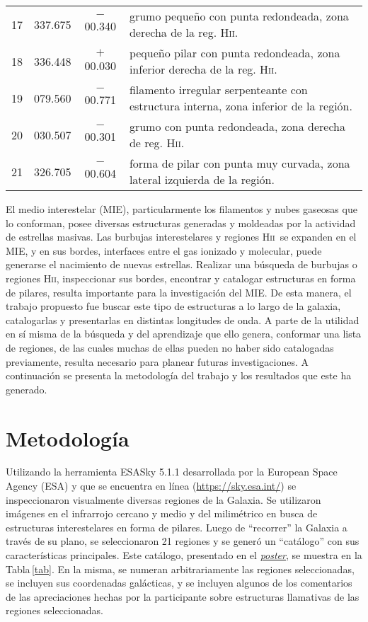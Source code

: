 \documentclass[baaa]{baaa}
\newcommand{\hii}{H\textsc{ii}}
\begin{document}
\begin{table*}
\begin{tabular}{cccl}
17	& 337.675	& $-$00.340 &	grumo pequeño con punta redondeada, zona derecha de la reg. \hii.\\
18	& 336.448	& $+$00.030  & pequeño pilar con punta redondeada, zona inferior derecha de la reg. \hii.\\
19	& 079.560	& $-$00.771 &	filamento irregular serpenteante con estructura interna, zona inferior de la región.\\
20	& 030.507	& $-$00.301 &	grumo con punta redondeada, zona derecha de reg. \hii.\\
21	& 326.705	& $-$00.604  & forma de pilar con punta muy curvada, zona lateral izquierda de la región.\\ 
\hline 
\end{tabular}
\end{table*}


El medio interestelar (MIE), particularmente los filamentos y nubes gaseosas que lo conforman, posee diversas estructuras generadas y moldeadas por la actividad
de estrellas masivas. Las burbujas interestelares y regiones \hii~se expanden en el MIE, y en sus bordes, interfaces entre el gas ionizado y molecular, puede generarse el nacimiento de nuevas estrellas. Realizar una búsqueda de burbujas o regiones \hii, inspeccionar sus bordes, encontrar y catalogar estructuras en forma de pilares, resulta importante para la investigación del MIE. De esta manera, el trabajo propuesto fue buscar este tipo de estructuras a lo largo de la galaxia, catalogarlas y presentarlas en distintas longitudes de onda. A parte de la utilidad en sí misma de la búsqueda y del aprendizaje que ello genera, conformar una lista de regiones, de las cuales muchas de ellas pueden no haber sido catalogadas previamente, resulta  necesario para planear futuras investigaciones. A continuación se presenta la metodología del trabajo y los resultados que este ha generado. 



\section{Metodología}

Utilizando la herramienta {\sc ESASky 5.1.1} desarrollada por la European Space Agency (ESA) y que se encuentra en línea (\href{https://sky.esa.int/}{https://sky.esa.int/}) se inspeccionaron visualmente diversas regiones de la Galaxia. Se utilizaron imágenes en el infrarrojo cercano y medio y del milimétrico en busca de estructuras interestelares en forma de pilares. 
Luego de ``recorrer'' la Galaxia a través de su plano, se seleccionaron 21 regiones y se generó un ``catálogo'' con sus características principales. Este catálogo, presentado en el \href{https://drive.google.com/file/d/1jPkcz38K4z3n5LWQfzG0_lRuLYAq73Kx/view}{\it poster}, se muestra en la Tabla\,\ref{tab}. En la misma, se numeran arbitrariamente las regiones seleccionadas, se incluyen sus coordenadas galácticas, y se incluyen algunos de los comentarios de las apreciaciones hechas por la participante sobre estructuras llamativas de las regiones seleccionadas.
\end{document}
